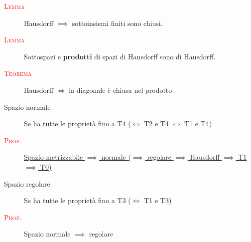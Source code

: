 \documentclass[a4paper,10pt]{article}
\newcommand{\myth}{\normalfont \scshape \textcolor{red}}
\theoremstyle{remark}
\theoremstyle{definition}
\begin{document}
\begin{description}
    \item[\myth{Lemma}] Hausdorff $\implies$ sottoinsiemi finiti sono chiusi.
    \item[\myth{Lemma}] Sottospazi e \textbf{prodotti} di spazi di Hausdorff sono di Hausdorff.
    \item[\myth{Teorema}] Hausdorff $\iff$ la diagonale è chiusa nel prodotto
    \item[Spazio normale] Se ha tutte le proprietà fino a T4 ($\iff$ T2 e T4 $\iff$ T1 e T4)
    \item[\myth{Prop.}] \underline{Spazio metrizzabile $\implies$ normale ($\implies$ regolare $\implies$ Hausdorff $\implies$ T1 $\implies$ T0)}
    \item[Spazio regolare] Se ha tutte le proprietà fino a T3 ($\iff$ T1 e T3) 
    \item[\myth{Prop.}] Spazio normale $\implies$ regolare
    
\end{description}
\end{document}
